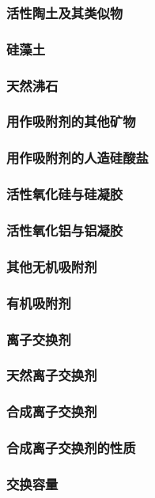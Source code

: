 \documentclass[UTF8]{../../ApplicationUniverse}
\begin{document}
        \subsubsection{活性陶土及其类似物}
        \subsubsection{硅藻土}
        \subsubsection{天然沸石}
        \subsubsection{用作吸附剂的其他矿物}
        \subsubsection{用作吸附剂的人造硅酸盐}
        \subsubsection{活性氧化硅与硅凝胶}
        \subsubsection{活性氧化铝与铝凝胶}
        \subsubsection{其他无机吸附剂}
    \subsubsection{有机吸附剂}
\subsubsection{离子交换剂}
    \subsubsection{天然离子交换剂}
    \subsubsection{合成离子交换剂}
        \subsubsection{合成离子交换剂的性质}
            \subsubsection{交换容量}
\end{document}
